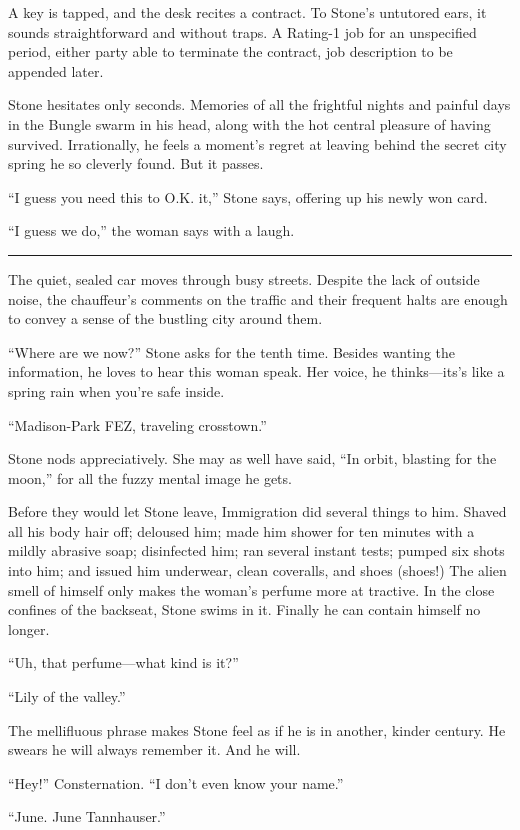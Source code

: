 A key is tapped, and the desk recites a contract. To Stone's untutored ears, it sounds straightforward and without traps. A Rating-1 job for an unspecified period, either party able to terminate the contract, job description to be appended later.

Stone hesitates only seconds. Memories of all the frightful nights and painful days in the Bungle swarm in his head, along with the hot central pleasure of having survived. Irrationally, he feels a moment's regret at leaving behind the secret city spring he so cleverly found. But it passes.

``I guess you need this to O.K. it,'' Stone says, offering up his newly won card.

``I guess we do,'' the woman says with a laugh.

\fancybreak{* * *}

The quiet, sealed car moves through busy streets. Despite the lack of outside noise, the chauffeur's comments on the traffic and their frequent halts are enough to convey a sense of the bustling city around them.

``Where are we now?'' Stone asks for the tenth time. Besides wanting the information, he loves to hear this woman speak. Her voice, he thinks---its's like a spring rain when you're safe inside.

``Madison-Park FEZ, traveling crosstown.''

Stone nods appreciatively. She may as well have said, ``In orbit, blasting for the moon,'' for all the fuzzy mental image he gets.

Before they would let Stone leave, Immigration did several things to him. Shaved all his body hair off; deloused him; made him shower for ten minutes with a mildly abrasive soap; disinfected him; ran several instant tests; pumped six shots into him; and issued him underwear, clean coveralls, and shoes (shoes!) The alien smell of himself only makes the woman's perfume more at tractive. In the close confines of the backseat, Stone swims in it. Finally he can contain himself no longer.

``Uh, that perfume---what kind is it?''

``Lily of the valley.''

The mellifluous phrase makes Stone feel as if he is in another, kinder century. He swears he will always remember it. And he will.

``Hey!'' Consternation. ``I don't even know your name.''

``June. June Tannhauser.''

